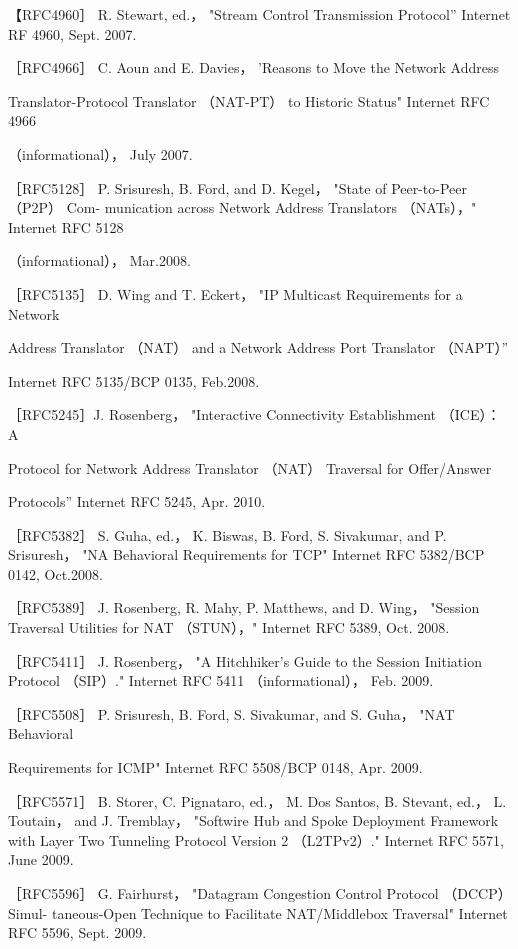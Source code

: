 【RFC4960］ R. Stewart, ed.， "Stream Control Transmission Protocol” Internet RF
4960, Sept. 2007.

［RFC4966］ C. Aoun and E. Davies， 'Reasons to Move the Network Address

Translator-Protocol Translator （NAT-PT） to Historic Status" Internet RFC 4966

（informational）， July 2007.

［RFC5128］ P. Srisuresh, B. Ford, and D. Kegel， "State of Peer-to-Peer （P2P） Com-
munication across Network Address Translators （NATs），" Internet RFC 5128

（informational）， Mar.2008.

［RFC5135］ D. Wing and T. Eckert， "IP Multicast Requirements for a Network

Address Translator （NAT） and a Network Address Port Translator （NAPT）”

Internet RFC 5135/BCP 0135, Feb.2008.

［RFC5245］J. Rosenberg， "Interactive Connectivity Establishment （ICE）： A

Protocol for Network Address Translator （NAT） Traversal for Offer/Answer

Protocols” Internet RFC 5245, Apr. 2010.

［RFC5382］ S. Guha, ed.， K. Biswas, B. Ford, S. Sivakumar, and P. Srisuresh， "NA
Behavioral Requirements for TCP" Internet RFC 5382/BCP 0142, Oct.2008.

［RFC5389］ J. Rosenberg, R. Mahy, P. Matthews, and D. Wing， "Session Traversal
Utilities for NAT （STUN），" Internet RFC 5389, Oct. 2008.

［RFC5411］ J. Rosenberg， "A Hitchhiker's Guide to the Session Initiation Protocol
（SIP）." Internet RFC 5411 （informational）， Feb. 2009.

［RFC5508］ P. Srisuresh, B. Ford, S. Sivakumar, and S. Guha， "NAT Behavioral

Requirements for ICMP" Internet RFC 5508/BCP 0148, Apr. 2009.

［RFC5571］ B. Storer, C. Pignataro, ed.， M. Dos Santos, B. Stevant, ed.， L. Toutain，
and J. Tremblay， "Softwire Hub and Spoke Deployment Framework with Layer
Two Tunneling Protocol Version 2 （L2TPv2）." Internet RFC 5571, June 2009.

［RFC5596］ G. Fairhurst， "Datagram Congestion Control Protocol （DCCP） Simul-
taneous-Open Technique to Facilitate NAT/Middlebox Traversal" Internet RFC
5596, Sept. 2009.

